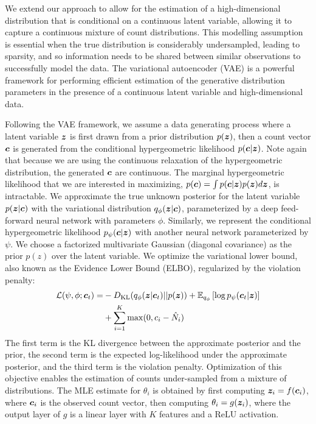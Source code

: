 \documentclass{article}
\theoremstyle{plain}
\theoremstyle{definition}
\theoremstyle{remark}
\begin{document}
We extend our approach to allow for the estimation of a high-dimensional distribution that is conditional on a continuous latent variable, allowing it to capture a continuous mixture of count distributions. This modelling assumption is essential when the true distribution is considerably undersampled, leading to sparsity, and so information needs to be shared between similar observations to successfully model the data. The variational autoencoder (VAE) \citep{kingma_auto-encoding_2014} is a powerful framework for performing efficient estimation of the generative distribution parameters in the presence of a continuous latent variable and high-dimensional data.

Following the VAE framework, we assume a data generating process where a latent variable ${\bm{z}}$ is first drawn from a prior distribution $p({\bm{z}})$, then a count vector ${\bm{c}}$ is generated from the conditional hypergeometric likelihood $p({\bm{c}}|{\bm{z}})$. Note again that because we are using the continuous relaxation of the hypergeometric distribution, the generated ${\bm{c}}$ are continuous. The marginal hypergeometric likelihood that we are interested in maximizing, $p({\bm{c}}) = \int p({\bm{c}}|{\bm{z}}) p({\bm{z}}) d{\bm{z}}$, is intractable. We approximate the true unknown posterior for the latent variable $p({\bm{z}}|{\bm{c}})$ with the variational distribution $q_\phi({\bm{z}}|{\bm{c}})$, parameterized by a deep feed-forward neural network with parameters $\phi$. Similarly, we represent the conditional hypergeometric likelihood $p_\psi({\bm{c}}|{\bm{z}})$ with another neural network parameterized by $\psi$. We choose a factorized multivariate Gaussian (diagonal covariance) as the prior $p(z)$ over the latent variable. We optimize the variational lower bound, also known as the Evidence Lower Bound (ELBO), regularized by the violation penalty:
\begin{align}
    \begin{split}
        \mathcal{L}(\psi, \phi; {\bm{c}}_t) = &-D_\text{KL}(q_\phi({\bm{z}}|{\bm{c}}_t) || p({\bm{z}}))
        + \mathbb{E}_{q_\phi}\left[ \log p_\psi ({\bm{c}}_t|{\bm{z}}) \right] \\
        &+ \sum_{i=1}^K \max(0, c_i - \hat{N}_i)
    \end{split}
\end{align}
The first term is the KL divergence between the approximate posterior and the prior, the second term is the expected log-likelihood under the approximate posterior, and the third term is the violation penalty. Optimization of this objective enables the estimation of counts under-sampled from a mixture of distributions. The MLE estimate for $\theta_i$ is obtained by first computing ${\bm{z}}_i = f({\bm{c}}_i)$, where ${\bm{c}}_i$ is the observed count vector, then computing $\theta_i = g({\bm{z}}_i)$, where the output layer of $g$ is a linear layer with $K$ features and a ReLU activation.
\end{document}
